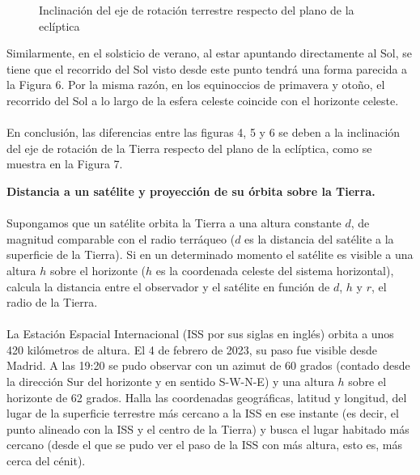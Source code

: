 \documentclass{article}
\begin{document}
\begin{sol}
\begin{figure}
\caption{Inclinación del eje de rotación terrestre respecto del plano de la eclíptica}
\label{}
\end{figure}
Similarmente, en el solsticio de verano, al estar apuntando directamente al Sol, se tiene que el recorrido del Sol visto desde este punto tendrá una forma parecida a la Figura 6. Por la misma razón, en los equinoccios de primavera y otoño, el recorrido del Sol a lo largo de la esfera celeste coincide con el horizonte celeste. \\ \\
En conclusión, las diferencias entre las figuras 4, 5 y 6 se deben a la inclinación del eje de rotación de la Tierra respecto del plano de la eclíptica, como se muestra en la Figura 7.
\end{sol}
\begin{ej}
\textbf{Distancia a un satélite y proyección de su órbita sobre la Tierra.} \\ \\
Supongamos que un satélite orbita la Tierra a una altura constante $\displaystyle d $, de magnitud comparable con el radio terráqueo ($\displaystyle d $ es la distancia del satélite a la superficie de la Tierra). Si en un determinado momento el satélite es visible a una altura $\displaystyle h $ sobre el horizonte ($\displaystyle h $ es la coordenada celeste del sistema horizontal), calcula la distancia entre el observador y el satélite en función de $\displaystyle d $, $\displaystyle h $ y $\displaystyle r $, el radio de la Tierra. \\ \\
La Estación Espacial Internacional (ISS por sus siglas en inglés) orbita a unos 420 kilómetros de altura. El 4 de febrero de 2023, su paso fue visible desde Madrid. A las 19:20 se pudo observar con un azimut de 60 grados (contado desde la dirección Sur del horizonte y en sentido S-W-N-E) y una altura $\displaystyle h $ sobre el horizonte de 62 grados. Halla las coordenadas geográficas, latitud y longitud, del lugar de la superficie terrestre más cercano a la ISS en ese instante (es decir, el punto alineado con la ISS y el centro de la Tierra) y busca el lugar habitado más cercano (desde el que se pudo ver el paso de la ISS con más altura, esto es, más cerca del cénit).
\end{ej}
\end{document}
